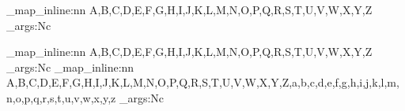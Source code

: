 \newcommand{\mat}[1]{\mathbb{M}_{#1}}


\newcommand{\norm}[1]{\left\lVert#1\right\rVert}


\newcommand{\dell}{\partial}

\ExplSyntaxOn
{} {
  \clist_map_inline:nn {A,B,C,D,E,F,G,H,I,J,K,L,M,N,O,P,Q,R,S,T,U,V,W,X,Y,Z} {
    \exp_args:Nc  {
    }
  }
}

{} {
  \clist_map_inline:nn {A,B,C,D,E,F,G,H,I,J,K,L,M,N,O,P,Q,R,S,T,U,V,W,X,Y,Z} {
    \exp_args:Nc  {
    }
  }
}
{} {
  \clist_map_inline:nn {A,B,C,D,E,F,G,H,I,J,K,L,M,N,O,P,Q,R,S,T,U,V,W,X,Y,Z,a,b,c,d,e,f,g,h,i,j,k,l,m,n,o,p,q,r,s,t,u,v,w,x,y,z} {
    \exp_args:Nc  {
    }
  }
}

\ExplSyntaxOff

{}
{}


\newcommand{\mqty}[2][p]{%
    \if#1p%
        \begin{pmatrix} #2 \end{pmatrix}%
    \else\if#1s%
        \begin{bmatrix} #2 \end{bmatrix}%
    \else\if#1c%
        \begin{Bmatrix} #2 \end{Bmatrix}%
    \else
        \begin{pmatrix} #2 \end{pmatrix}%
    \fi\fi\fi
}